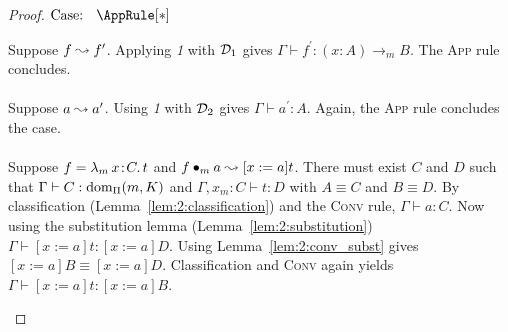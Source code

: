 \begin{proof}
    $\text{Case: }\begin{array}{c} \AppRule[*] \end{array}$
    \begin{proofcase}
        Suppose $f \leadsto f^\prime$.
        Applying \textit{1} with $\mathcal{D}_{1}$ gives $\Gamma \vdash f^\prime : (x : A) \to_m B$.
        The \textsc{App} rule concludes.
        \\ \\
        Suppose $a \leadsto a^\prime$.
        Using \textit{1} with $\mathcal{D}_{2}$ gives $\Gamma \vdash a^\prime : A$.
        Again, the \textsc{App} rule concludes the case.
        \\ \\
        Suppose $f = {\lambda_m}\, x\! : \! C.\, t$ and $f \bullet_{m} a \leadsto [x := a]t$.
        There must exist $C$ and $D$ such that $\Gamma \vdash C : \mbox{\normalfont dom}_\Pi(m, K)$ and $\Gamma, x_m : C \vdash t : D$ with $A \equiv C$ and $B \equiv D$.
        By classification (Lemma~\ref{lem:2:classification}) and the \textsc{Conv} rule, $\Gamma \vdash a : C$.
        Now using the substitution lemma (Lemma~\ref{lem:2:substitution}) $\Gamma \vdash [x := a]t : [x := a]D$.
        Using Lemma~\ref{lem:2:conv_subst} gives $[x := a]B \equiv [x := a]D$.
        Classification and \textsc{Conv} again yields $\Gamma \vdash [x := a]t : [x := a]B$.
    \end{proofcase}


\end{proof}
